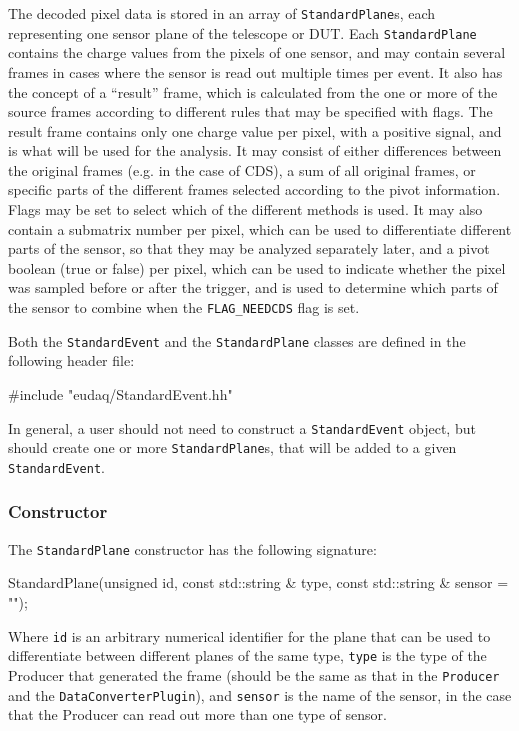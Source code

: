 The decoded pixel data is stored in an array of \texttt{StandardPlane}s, each representing one sensor plane of the telescope or \gls{DUT}.
Each \texttt{StandardPlane} contains the charge values from the pixels of one sensor,
and may contain several frames in cases where the sensor is read out multiple times per event.
It also has the concept of a ``result'' frame, which is calculated from the one or more of the source frames
according to different rules that may be specified with flags.
The result frame contains only one charge value per pixel, with a positive signal,
and is what will be used for the analysis.
It may consist of either differences between the original frames (e.g. in the case of \gls{CDS}),
a sum of all original frames, or specific parts of the different frames selected according to the pivot information.
Flags may be set to select which of the different methods is used.
It may also contain a submatrix number per pixel, which can be used to differentiate different parts of the sensor,
so that they may be analyzed separately later, and a pivot boolean (true or false) per pixel,
which can be used to indicate whether the pixel was sampled before or after the trigger,
and is used to determine which parts of the sensor to combine when the \texttt{FLAG\_NEEDCDS} flag is set.

Both the \texttt{StandardEvent} and the \texttt{StandardPlane} classes are defined in the following header file:
\begin{listing}
#include "eudaq/StandardEvent.hh"
\end{listing}

In general, a user should not need to construct a \texttt{StandardEvent} object,
but should create one or more \texttt{StandardPlane}s, that will be added to a given \texttt{StandardEvent}.

\subsubsection{Constructor}
The \texttt{StandardPlane} constructor has the following signature:
\begin{listing}
StandardPlane(unsigned id, const std::string & type,
              const std::string & sensor = "");
\end{listing}

Where \texttt{id} is an arbitrary numerical identifier for the plane
that can be used to differentiate between different planes of the same type,
\texttt{type} is the type of the Producer that generated the frame
(should be the same as that in the \texttt{Producer} and the \texttt{DataConverterPlugin}),
and \texttt{sensor} is the name of the sensor,
in the case that the Producer can read out more than one type of sensor.

